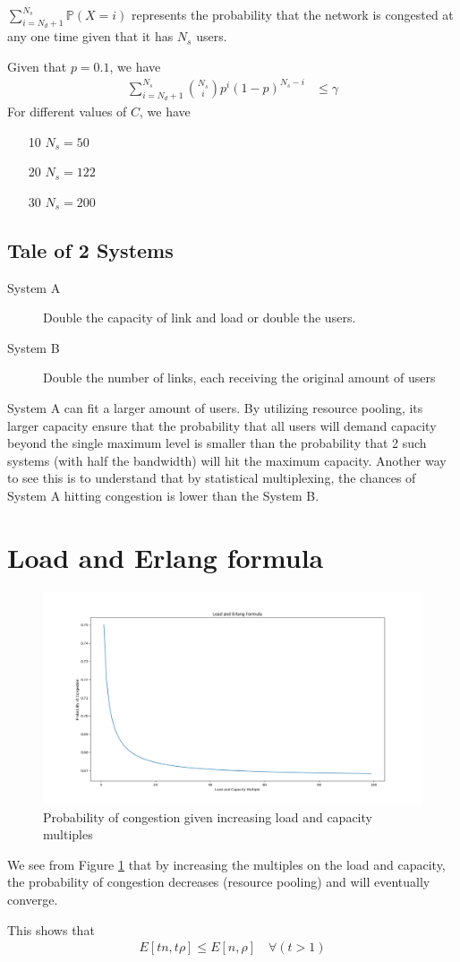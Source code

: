 \documentclass[]{article}
\begin{document}
$\sum_{i = N_d + 1}^{N_s} \mathbb{P}(X = i)$ represents the probability that the network is congested at any one time given that it has $N_s$ users.

Given that $p = 0.1$, we have
\begin{align*}
\sum_{i = N_d + 1}^{N_s} \binom{N_s}{i} p^i (1 - p)^{N_s - i} &\leq \gamma
\end{align*}
For different values of $C$, we have
\begin{enumerate}
\item[10] $N_s = 50$
\item[20] $N_s = 122$
\item[30] $N_s = 200$
\end{enumerate}

\subsection{Tale of 2 Systems}

\begin{description}
\item[System A] Double the capacity of link and load or double the users. 
\item[System B] Double the number of links, each receiving the original amount of users
\end{description}

System A can fit a larger amount of users. By utilizing resource pooling, its larger capacity ensure that the probability that all users will demand capacity beyond the single maximum level is smaller than the probability that 2 such systems (with half the bandwidth) will hit the maximum capacity. Another way to see this is to understand that by statistical multiplexing, the chances of System A hitting congestion is lower than the System B.

\section{Load and Erlang formula}

\begin{figure}[H]
\centering
\includegraphics[width=\linewidth]{figure-1.png}
\caption{Probability of congestion given increasing load and capacity multiples}
\label{fig:LEF}
\end{figure}

We see from Figure \ref{fig:LEF} that by increasing the multiples on the load and capacity, the probability of congestion decreases (resource pooling) and will eventually converge.

This shows that
\begin{gather*}
E[tn, t\rho] \leq E[n, \rho] \quad \forall (t > 1)
\end{gather*}
\end{document}

